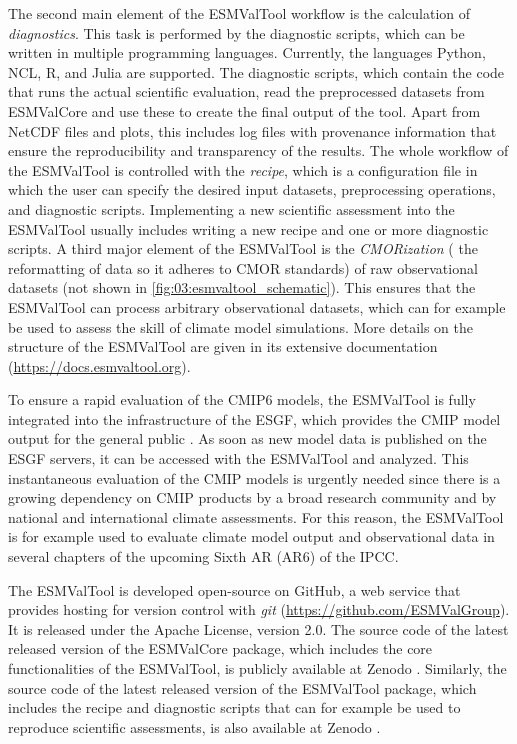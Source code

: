The second main element of the \ac{ESMValTool} workflow is the calculation of
\emph{diagnostics}. This task is performed by the diagnostic scripts, which can
be written in multiple programming languages. Currently, the languages Python,
NCL, R, and Julia are supported. The diagnostic scripts, which contain the code
that runs the actual scientific evaluation, read the preprocessed datasets from
\ac{ESMValCore} and use these to create the final output of the tool. Apart
from \ac{NetCDF} files and plots, this includes log files with provenance
information that ensure the reproducibility and transparency of the results.
The whole workflow of the \ac{ESMValTool} is controlled with the \emph{recipe},
which is a configuration file in which the user can specify the desired input
datasets, preprocessing operations, and diagnostic scripts. Implementing a new
scientific assessment into the \ac{ESMValTool} usually includes writing a new
recipe and one or more diagnostic scripts. A third major element of the
\ac{ESMValTool} is the \emph{\acs{CMOR}ization} (\ie{} the reformatting of data
so it adheres to \ac{CMOR} standards) of raw observational datasets (not shown
in \cref{fig:03:esmvaltool_schematic}). This ensures that the \ac{ESMValTool}
can process arbitrary observational datasets, which can for example be used to
assess the skill of climate model simulations. More details on the structure of
the \ac{ESMValTool} are given in its extensive documentation
(\url{https://docs.esmvaltool.org}).

To ensure a rapid evaluation of the \acs{CMIP}6 models, the \ac{ESMValTool} is
fully integrated into the infrastructure of the \ac{ESGF}, which provides the
\ac{CMIP} model output for the general public \autocite{Eyring2016b}. As soon
as new model data is published on the \ac{ESGF} servers, it can be accessed
with the \ac{ESMValTool} and analyzed. This instantaneous evaluation of the
\ac{CMIP} models is urgently needed since there is a growing dependency on
\ac{CMIP} products by a broad research community and by national and
international climate assessments. For this reason, the \ac{ESMValTool} is for
example used to evaluate climate model output and observational data in several
chapters of the upcoming Sixth \acl{AR} (\acs{AR}6) of the \ac{IPCC}.

The \ac{ESMValTool} is developed open-source on GitHub, a web service that
provides hosting for version control with \emph{git}
(\url{https://github.com/ESMValGroup}). It is released under the Apache
License, version 2.0. The source code of the latest released version of the
\ac{ESMValCore} package, which includes the core functionalities of the
\ac{ESMValTool}, is publicly available at Zenodo \autocite{Andela2020a}.
Similarly, the source code of the latest released version of the
\ac{ESMValTool} package, which includes the recipe and diagnostic scripts that
can for example be used to reproduce scientific assessments, is also available
at Zenodo \autocite{Andela2020}.


